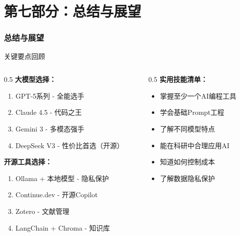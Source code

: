 \documentclass[aspectratio=169,11pt]{beamer}
\begin{document}
\part{第七部分：总结与展望}

\section{总结与展望}

\begin{frame}{关键要点回顾}
    \begin{columns}
        \begin{column}{0.5\textwidth}
            \textbf{大模型选择：}
            \begin{enumerate}
                \item GPT-5系列 - 全能选手
                \item Claude 4.5 - 代码之王
                \item Gemini 3 - 多模态强手
                \item DeepSeek V3 - 性价比首选（开源）
            \end{enumerate}
            
            \vspace{0.3cm}
            \textbf{开源工具选择：}
            \begin{enumerate}
                \item Ollama + 本地模型 - 隐私保护
                \item Continue.dev - 开源Copilot
                \item Zotero - 文献管理
                \item LangChain + Chroma - 知识库
            \end{enumerate}
        \end{column}
        \begin{column}{0.5\textwidth}
            \textbf{实用技能清单：}
            \begin{itemize}
                \item[\checkmark] 掌握至少一个AI编程工具
                \item[\checkmark] 学会基础Prompt工程
                \item[\checkmark] 了解不同模型特点
                \item[\checkmark] 能在科研中合理应用AI
                \item[\checkmark] 知道如何控制成本
                \item[\checkmark] 了解数据隐私保护
            \end{itemize}
            

\end{column}
\end{columns}
\end{frame}
\end{document}
